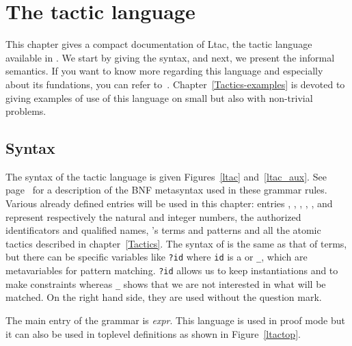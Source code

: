 \chapter{The tactic language}
\label{TacticLanguage}


This chapter gives a compact documentation of Ltac, the tactic
language available in {\Coq}. We start by giving the syntax, and next,
we present the informal semantics. If you want to know more regarding
this language and especially about its fundations, you can refer
to~\cite{Del00}. Chapter~\ref{Tactics-examples} is devoted to giving
examples of use of this language on small but also with non-trivial
problems.


\section{Syntax}

\def\tacexpr{\textrm{\textsl{expr}}}
\def\tacexprlow{\textrm{\textsl{tacexpr$_1$}}}
\def\tacexprinf{\textrm{\textsl{tacexpr$_2$}}}
\def\tacexprpref{\textrm{\textsl{tacexpr$_3$}}}
\def\atom{\textrm{\textsl{atom}}}
\def\recclause{\textrm{\textsl{rec\_clause}}}
\def\letclause{\textrm{\textsl{let\_clause}}}
\def\matchrule{\textrm{\textsl{match\_rule}}}
\def\contextrule{\textrm{\textsl{context\_rule}}}
\def\contexthyps{\textrm{\textsl{context\_hyps}}}
\def\tacarg{\nterm{tacarg}}
\def\cpattern{\nterm{cpattern}}

The syntax of the tactic language is given Figures~\ref{ltac}
and~\ref{ltac_aux}. See page~\pageref{BNF-syntax} for a description of
the BNF metasyntax used in these grammar rules. Various already defined
entries will be used in this chapter: entries {\naturalnumber},
{\integer}, {\ident}, {\qualid}, {\term}, {\cpattern} and {\atomictac}
represent respectively the natural and integer numbers, the authorized
identificators and qualified names, {\Coq}'s terms and patterns and
all the atomic tactics described in chapter~\ref{Tactics}. The syntax
of {\cpattern} is the same as that of terms, but there can be specific
variables like {\tt ?id} where {\tt id} is a {\ident} or {\tt \_},
which are metavariables for pattern matching. {\tt ?id} allows us to
keep instantiations and to make constraints whereas {\tt \_} shows
that we are not interested in what will be matched. On the right hand
side, they are used without the question mark.

The main entry of the grammar is {\tacexpr}. This language is used in
proof mode but it can also be used in toplevel definitions as shown in
Figure~\ref{ltactop}.

